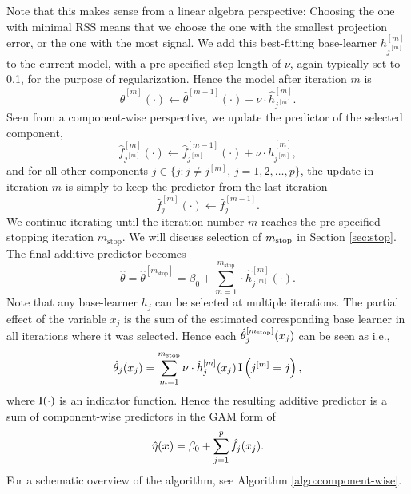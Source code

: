 Note that this makes sense from a linear algebra perspective:
Choosing the one with minimal RSS means that we choose the one with the smallest projection error, or the one with the most signal.
We add this best-fitting base-learner $h_{j^{[m]}}^{[m]}$ to the current model, with a pre-specified step length of $\nu$, again typically set to 0.1, for the purpose of regularization.
Hence the model after iteration $m$ is
\begin{equation*}
    \hat{\theta}^{[m]}(\cdot)\gets \hat{\theta}^{[m-1]}(\cdot)+\nu\cdot\hat{h}^{[m]}_{j^{[m]}}.
\end{equation*}
Seen from a component-wise perspective, we update the predictor of the selected component,
\begin{equation*}
    \hat{f}_{j^{[m]}}^{[m]}(\cdot)\gets \hat{f}_{j^{[m]}}^{[m-1]}(\cdot)+\nu\cdot\hat{h}^{[m]}_{j^{[m]}},
\end{equation*}
and for all other components $j\in\{j\colon j\neq j^{[m]},\,j=1,2,\ldots,p\}$, the update in iteration $m$ is simply
to keep the predictor from the last iteration
\begin{equation*}
    \hat{f}_{j}^{[m]}(\cdot)\gets \hat{f}_{j}^{[m-1]}.
\end{equation*}
We continue iterating until the iteration number $m$ reaches the pre-specified stopping iteration $m_{\text{stop}}$.
We will discuss selection of $m_{\text{stop}}$ in Section \ref{sec:stop}.
The final additive predictor becomes
\begin{equation*}
    \hat{\theta}=\hat{\theta}^{[m_{\text{stop}}]}=\beta_0 + \sum_{m=1}^{m_{\text{stop}}}\cdot\hat{h}_{j^{[m]}}^{[m]}(\cdot).
\end{equation*}
Note that any base-learner $h_j$ can be selected at multiple iterations.
The partial effect of the variable $x_j$ is the sum of the estimated corresponding base learner in all iterations where it was selected.
Hence each $\hat{\theta}_j^{[m_{\text{stop}}]}(x_j)$ can be seen as
i.e.,
\begin{equation*}
    \hat{\theta}_j(x_j)=\sum_{m=1}^{m_{\text{stop}}}\nu\cdot\hat{h}_j^{[m]}(x_j)\operatorname{I}\left(j^{[m]}=j\right),
\end{equation*}
where $\operatorname{I}(\cdot)$ is an indicator function.
Hence the resulting additive predictor is a sum of component-wise predictors in the GAM form of
\begin{equation*}
    \hat{\eta}(\bm{x})=\beta_0+\sum_{j=1}^p \hat{f}_j(x_j).
\end{equation*}
For a schematic overview of the algorithm, see Algorithm \ref{algo:component-wise}.
